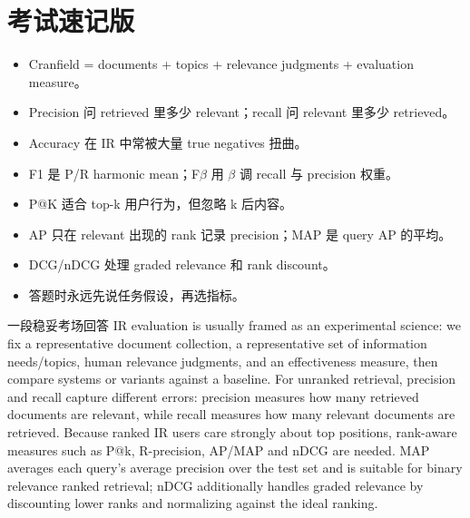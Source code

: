 \documentclass[11pt,a4paper]{ctexart}
\begin{document}
\section{考试速记版}
\begin{itemize}
\item Cranfield = documents + topics + relevance judgments + evaluation measure。
\item Precision 问 retrieved 里多少 relevant；recall 问 relevant 里多少 retrieved。
\item Accuracy 在 IR 中常被大量 true negatives 扭曲。
\item F1 是 P/R harmonic mean；F\(\beta\) 用 \(\beta\) 调 recall 与 precision 权重。
\item P@K 适合 top-k 用户行为，但忽略 k 后内容。
\item AP 只在 relevant 出现的 rank 记录 precision；MAP 是 query AP 的平均。
\item DCG/nDCG 处理 graded relevance 和 rank discount。
\item 答题时永远先说任务假设，再选指标。
\end{itemize}
\begin{callout}{一段稳妥考场回答}
IR evaluation is usually framed as an experimental science: we fix a representative document collection, a representative set of information needs/topics, human relevance judgments, and an effectiveness measure, then compare systems or variants against a baseline. For unranked retrieval, precision and recall capture different errors: precision measures how many retrieved documents are relevant, while recall measures how many relevant documents are retrieved. Because ranked IR users care strongly about top positions, rank-aware measures such as P@k, R-precision, AP/MAP and nDCG are needed. MAP averages each query’s average precision over the test set and is suitable for binary relevance ranked retrieval; nDCG additionally handles graded relevance by discounting lower ranks and normalizing against the ideal ranking.
\end{callout}
\end{document}
